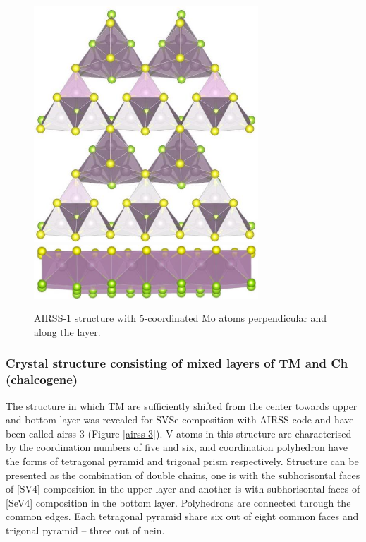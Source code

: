 \documentclass[a4paperm]{article}
\begin{document}
\begin{figure}[H]
        \includegraphics[width=0.75\textwidth]{airss-1-1.jpg} \\ \vspace{3mm}
        \includegraphics[width=0.75\textwidth]{airss-1-2.jpg}
        \caption{AIRSS-1 structure with 5-coordinated Mo atoms perpendicular and along the layer.}
\label{airss-1}
\end{figure}



\subsubsection{Crystal structure consisting of mixed layers of TM and Ch (chalcogene)}

The structure in which TM are sufficiently shifted from the center towards upper and bottom layer was revealed for SVSe composition with AIRSS code and have been called airss-3 (Figure \ref{airss-3}).
V atoms in this structure are characterised by the coordination numbers of five and six, and coordination polyhedron have the forms of tetragonal pyramid and trigonal prism respectively.
Structure can be presented as the combination of double chains, one is with the subhorisontal faces of [SV4] composition in the upper layer and another is with subhorisontal faces of [SeV4] composition in the bottom layer.
Polyhedrons are connected through the common edges.
Each tetragonal pyramid share six out of eight common faces and trigonal pyramid – three out of nein.
\end{document}
